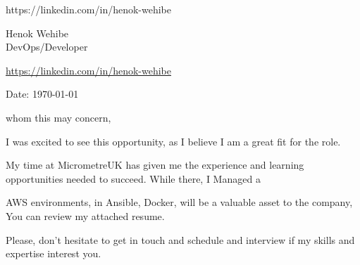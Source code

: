 \documentclass[11pt,a4]{article}
\begin{document}
\begin{center}
    \begin{minipage}[b]{0.24\textwidth}
            \large \href{mailtwwwwwwwo:youremail@email.com}{}https://linkedin.com/in/henok-wehibe
    \end{minipage}%
    \begin{minipage}[b]{0.4\textwidth}
            \centering
            {\Huge Henok Wehibe} \\ %
            \vspace{0.1cm}
            {\color{UI_blue} \Large{DevOps/Developer}} \\
    \end{minipage}%
    \begin{minipage}[b]{0.24\textwidth}
            \flushright \large
            {\href{https://www.linkedin.com/in/link/}{https://linkedin.com/in/henok-wehibe} } \\
            \href{https://Add_your_portfolio_here_}{}
    \end{minipage}   
    
\vspace{-0.15cm} 
{\color{UI_blue} \hrulefill}
\end{center}

\justify
\setlength{\parindent}{0pt}
\setlength{\parskip}{12pt}
\vspace{0.2cm}



Date: \today \par \vspace{-0.1cm}
whom this may concern, 

I was excited to see this opportunity, as I believe I am a great fit for the role. 

My time at MicrometreUK has given me the experience and learning opportunities needed to succeed. 
While there, I Managed a \par
AWS environments, 
in Ansible, Docker, 
will be a valuable asset to the company, 
You can review my attached resume.

Please, don't hesitate to get in touch and schedule and interview if my skills and expertise interest you.
\end{document}
